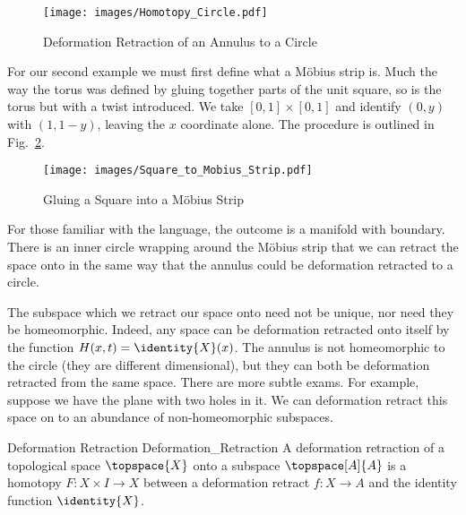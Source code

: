 \documentclass[oneside]{book}                                                  %
\begin{document}
                \begin{figure}[H]
                    \centering
                    \captionsetup{type=figure}
                    \texttt{[image: images/Homotopy\_Circle.pdf]}
                    \caption{Deformation Retraction of an Annulus to a Circle}
                    \label{fig:Def_Retract_Annulus_to_Circle}
                \end{figure}
                For our second example we must first define what a M\"{o}bius
                strip is. Much the way the torus was defined by gluing together
                parts of the unit square, so is the torus but with a twist
                introduced. We take $[0,1]\times[0,1]$ and identify
                $(0,y)$ with $(1,1-y)$, leaving the $x$ coordinate alone.
                The procedure is outlined in
                Fig.~\ref{fig:Square_to_Mobius_Strip}.
                \begin{figure}[H]
                    \centering
                    \captionsetup{type=figure}
                    \texttt{[image: images/Square\_to\_Mobius\_Strip.pdf]}
                    \caption{Gluing a Square into a M\"{o}bius Strip}
                    \label{fig:Square_to_Mobius_Strip}
                \end{figure}
                For those familiar with the language, the outcome is a manifold
                with boundary. There is an inner circle wrapping around the
                M\"{o}bius strip that we can retract the space onto in the same
                way that the annulus could be deformation retracted to a circle.
                \par\hfill\par
                The subspace which we retract our space onto need not be unique,
                nor need they be homeomorphic. Indeed, any space can be
                deformation retracted onto itself by the function
                $H(x,t)=\identity{X}(x)$. The annulus is not homeomorphic to the
                circle (they are different dimensional), but they can both be
                deformation retracted from the same space. There are more subtle
                exams. For example, suppose we have the plane with two holes in
                it. We can deformation retract this space on to an abundance of
                non-homeomorphic subspaces.
                \begin{fdefinition}{Deformation Retraction}
                                   {Deformation_Retraction}
                    A deformation retraction of a topological space
                    $\topspace{X}$ onto a subspace $\topspace[A]{A}$ is a
                    homotopy $F:X\times{I}\rightarrow{X}$ between a deformation
                    retract $f:X\rightarrow{A}$ and the identity function
                    $\identity{X}$.
                \end{fdefinition}
\end{document}
